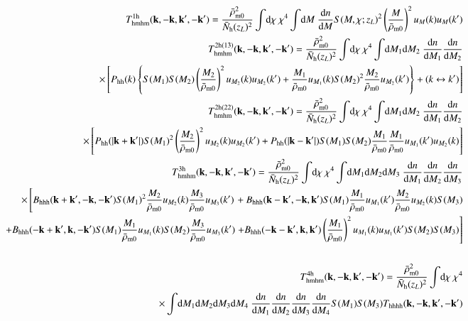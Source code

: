\documentclass[onecolumn,notitlepage,showpacs,amsmath,amssymb,prd,floatfix]{revtex4-1}
\newcommand{\bk}{{\bf k}}
\newcommand{\dr}{\mathrm{d}}
\newcommand{\bh}{\mathrm{h}}
\begin{document}
\begin{eqnarray}
 &&T^{\rm 1h}_{\rm hmhm}(\bk,-\bk,\bk',-\bk')=\frac{\bar{\rho}_{\rm m0}^2}{\bar{N}_\bh(z_L)^2}
  \int\!\dr\chi~\chi^4
  \int\!\dr M~\frac{\dr n}{\dr M}S(M,\chi;z_L)^2\left(\frac{M}{\bar{\rho}_{\rm
					m0}}\right)^2
  u_M(k)u_M(k')\\
  &&T^{\rm 2h(13)}_{\rm hmhm}(\bk,-\bk,\bk',-\bk')=
  \frac{\bar{\rho}_{\rm m0}^2}{\bar{N}_\bh(z_L)^2}
  \int\!\dr\chi~\chi^4
  \int\!\dr M_1\dr M_2~\frac{\dr n}{\dr M_1}\frac{\dr n}{\dr M_2}\nonumber\\
&&\hspace{4em}\times  \left[
   P_{\rm hh}(k)\left\{S(M_1)S(M_2)\left(\frac{M_2}{\bar{\rho}_{\rm m0}}\right)^2
 u_{M_2}(k)u_{M_2}(k')
 +\frac{M_1}{\bar{\rho}_{\rm
 m0}}u_{M_1}(k)S(M_2)^2\frac{M_2}{\bar{\rho}_{\rm m0}}u_{M_2}(k')
		\right\} +(k\leftrightarrow k')  
  \right]\\
&&T^{\rm 2h(22)}_{\rm hmhm}(\bk,-\bk,\bk',-\bk')=
  \frac{\bar{\rho}_{\rm m0}^2}{\bar{N}_\bh(z_L)^2}
  \int\!\dr\chi~\chi^4
  \int\!\dr M_1\dr M_2~\frac{\dr n}{\dr M_1}\frac{\dr n}{\dr M_2}\nonumber\\
 &&\hspace{4em}\times
\left[
 P_{\rm hh}(|\bk+\bk'|)S(M_1)^2\left(\frac{M_2}{\bar{\rho}_{\rm
				m0}}\right)^2
 u_{M_2}(k)u_{M_2}(k')
 +P_{\rm hh}(|\bk-\bk'|)S(M_1)S(M_2)\frac{M_1}{\bar{\rho}_{\rm m0}}
 \frac{M_1}{\bar{\rho}_{\rm m0}}u_{M_1}(k')u_{M_2}(k)
	   \right]\\
&& T^{\rm 3h}_{\rm hmhm}(\bk,-\bk,\bk',-\bk')=
  \frac{\bar{\rho}_{\rm m0}^2}{\bar{N}_\bh(z_L)^2}
  \int\!\dr\chi~\chi^4
  \int\!\dr M_1\dr M_2\dr M_3~\frac{\dr n}{\dr M_1}\frac{\dr n}{\dr M_2}\frac{\dr n}{\dr M_3}\nonumber\\
 &&\hspace{4em}\times
  \left[
B_{\rm hhh}(\bk+\bk',-\bk,-\bk')S(M_1)^2\frac{M_2}{\bar{\rho}_{\rm
m0}}u_{M_2}(k)\frac{M_3}{\bar{\rho}_{\rm m0}}u_{M_3}(k')
  \right.
  +B_{\rm hhh}(\bk-\bk',-\bk,\bk')S(M_1)\frac{M_1}{\bar{\rho}_{\rm
m0}}u_{M_1}(k')
\frac{M_2}{\bar{\rho}_{\rm m0}}u_{M_2}(k)S(M_3)
\nonumber\\
&&\hspace{4em}
 +B_{\rm hhh}(-\bk+\bk',\bk,-\bk')S(M_1)\frac{M_1}{\bar{\rho}_{\rm
m0}}u_{M_1}(k)S(M_2)
\frac{M_3}{\bar{\rho}_{\rm m0}}u_{M_3}(k')
  \left.
		+B_{\rm hhh}(-\bk-\bk',\bk,\bk')
\left(\frac{M_1}{\bar{\rho}_{\rm m0}}\right)^2u_{M_1}(k)u_{M_1}(k')
S(M_2)S(M_3)\right]\nonumber\\
 &&\\
&& T^{\rm 4h}_{\rm hmhm}(\bk,-\bk,\bk',-\bk')=
  \frac{\bar{\rho}_{\rm m0}^2}{\bar{N}_\bh(z_L)^2}
  \int\!\dr\chi~\chi^4\nonumber\\
&&\hspace{6em}\times  \int\!\dr M_1\dr M_2\dr M_3\dr M_4~\frac{\dr n}{\dr M_1}\frac{\dr n}{\dr M_2}\frac{\dr n}{\dr M_3}
  \frac{\dr n}{\dr M_4}S(M_1)S(M_3)T_{\rm hhhh}(\bk,-\bk,\bk',-\bk')
\end{eqnarray}
\end{document}
